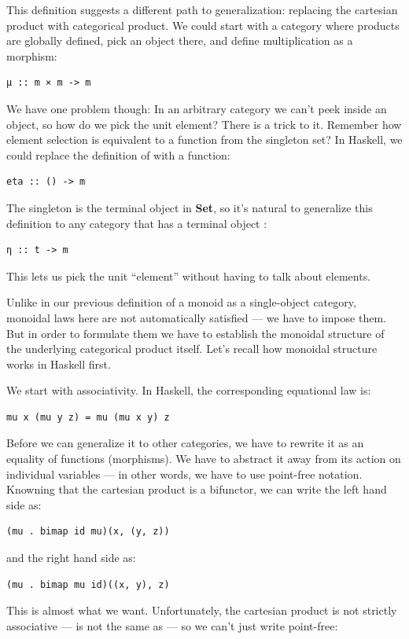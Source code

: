 This definition suggests a different path to generalization: replacing
the cartesian product with categorical product. We could start with a
category where products are globally defined, pick an object 
there, and define multiplication as a morphism:

\begin{verbatim}
μ :: m × m -> m
\end{verbatim}
We have one problem though: In an arbitrary category we can't peek
inside an object, so how do we pick the unit element? There is a trick
to it. Remember how element selection is equivalent to a function from
the singleton set? In Haskell, we could replace the definition of
 with a function:

\begin{verbatim}
eta :: () -> m
\end{verbatim}
The singleton is the terminal object in \textbf{Set}, so it's natural to
generalize this definition to any category that has a terminal object
:

\begin{verbatim}
η :: t -> m
\end{verbatim}
This lets us pick the unit ``element'' without having to talk about
elements.

Unlike in our previous definition of a monoid as a single-object
category, monoidal laws here are not automatically satisfied --- we have
to impose them. But in order to formulate them we have to establish the
monoidal structure of the underlying categorical product itself. Let's
recall how monoidal structure works in Haskell first.

We start with associativity. In Haskell, the corresponding equational
law is:

\begin{verbatim}
mu x (mu y z) = mu (mu x y) z
\end{verbatim}
Before we can generalize it to other categories, we have to rewrite it
as an equality of functions (morphisms). We have to abstract it away
from its action on individual variables --- in other words, we have to
use point-free notation. Knowning that the cartesian product is a
bifunctor, we can write the left hand side as:

\begin{verbatim}
(mu . bimap id mu)(x, (y, z))
\end{verbatim}
and the right hand side as:

\begin{verbatim}
(mu . bimap mu id)((x, y), z)
\end{verbatim}
This is almost what we want. Unfortunately, the cartesian product is not
strictly associative ---  is not the same as
 --- so we can't just write point-free:

